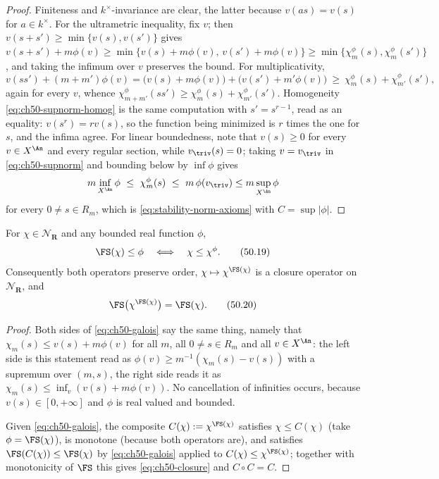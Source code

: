 \begin{proof}
Finiteness and $k^\times$-invariance are clear, the latter because
$v(as)=v(s)$ for $a\in k^\times$.  For the ultrametric inequality, fix
$v$; then $v(s+s')\ge\min\{v(s),v(s')\}$ gives
$v(s+s')+m\phi(v)\ge\min\{v(s)+m\phi(v),\,v(s')+m\phi(v)\}
\ge\min\{\chi^\phi_m(s),\chi^\phi_m(s')\}$, and taking the infimum over
$v$ preserves the bound.  For multiplicativity,
\[
 v(ss')+(m+m')\phi(v)
 =\bigl(v(s)+m\phi(v)\bigr)+\bigl(v(s')+m'\phi(v)\bigr)
 \ \ge\ \chi^\phi_m(s)+\chi^\phi_{m'}(s'),
\]
again for every $v$, whence $\chi^\phi_{m+m'}(ss')\ge\chi^\phi_m(s)
+\chi^\phi_{m'}(s')$.  Homogeneity \eqref{eq:ch50-supnorm-homog} is the
same computation with $s'=s^{r-1}$, read as an equality: $v(s^r)
=rv(s)$, so the function being minimized is $r$ times the one for
$s$, and the infima agree.  For linear boundedness, note that
$v(s)\ge0$ for every $v\in X^{\An}$ and every regular section, while
$v_{\triv}(s)=0$; taking $v=v_{\triv}$ in \eqref{eq:ch50-supnorm} and
bounding below by $\inf\phi$ gives
\[
 m\inf_{X^{\An}}\phi\ \le\ \chi^\phi_m(s)\ \le\ m\,\phi(v_{\triv})
 \le m\sup_{X^{\An}}\phi
\]
for every $0\ne s\in R_m$, which is \eqref{eq:stability-norm-axioms} with
$C=\sup|\phi|$.
\end{proof}

\begin{theorem}
\label{thm:ch50-galois}
For $\chi\in\mathcal N_{\mathbf R}$ and any bounded real function $\phi$,
\[
 \FS(\chi)\le\phi
 \quad\Longleftrightarrow\quad
 \chi\le\chi^\phi .
\tag{50.19}\label{eq:ch50-galois}
\]
Consequently both operators preserve order, $\chi\mapsto\chi^{\FS(\chi)}$ is a
closure operator on $\mathcal N_{\mathbf R}$, and
\[
 \FS\bigl(\chi^{\FS(\chi)}\bigr)=\FS(\chi).
\tag{50.20}\label{eq:ch50-closure}
\]
\end{theorem}

\begin{proof}
Both sides of \eqref{eq:ch50-galois} say the same thing, namely that
$\chi_m(s)\le v(s)+m\phi(v)$ for all $m$, all $0\ne s\in R_m$ and all
$v\in X^{\An}$: the left side is this statement read as
$\phi(v)\ge m^{-1}(\chi_m(s)-v(s))$ with a supremum over $(m,s)$, the
right side reads it as $\chi_m(s)\le\inf_v(v(s)+m\phi(v))$.  No
cancellation of infinities occurs, because $v(s)\in[0,+\infty]$ and
$\phi$ is real valued and bounded.

Given \eqref{eq:ch50-galois}, the composite $C(\chi):=\chi^{\FS(\chi)}$
satisfies $\chi\le C(\chi)$ (take $\phi=\FS(\chi)$), is monotone
(because both operators are), and satisfies
$\FS(C(\chi))\le\FS(\chi)$ by \eqref{eq:ch50-galois} applied to
$C(\chi)\le\chi^{\FS(\chi)}$; together with monotonicity of $\FS$ this
gives \eqref{eq:ch50-closure} and $C\circ C=C$.
\end{proof}

